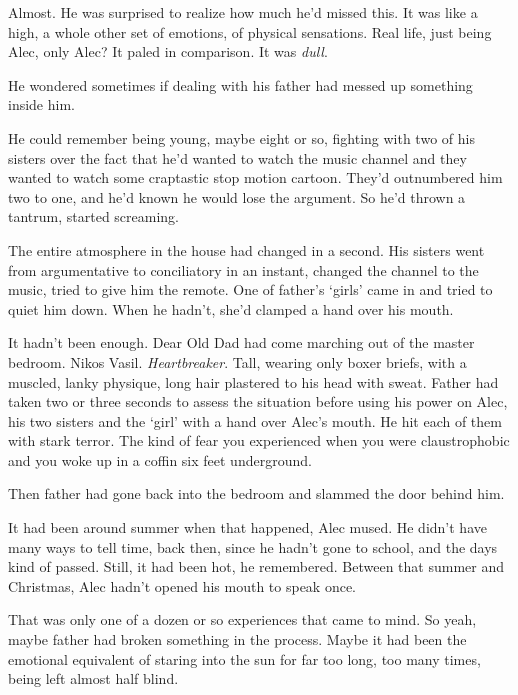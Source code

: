 Almost.  He was surprised to realize how much he'd missed this.  It was like a high, a whole other set of emotions, of physical sensations.  Real life, just being Alec, only Alec?  It paled in comparison.  It was \emph{dull}.



He wondered sometimes if dealing with his father had messed up something inside him.



He could remember being young, maybe eight or so, fighting with two of his sisters over the fact that he'd wanted to watch the music channel and they wanted to watch some craptastic stop motion cartoon.  They'd outnumbered him two to one, and he'd known he would lose the argument.  So he'd thrown a tantrum, started screaming.



The entire atmosphere in the house had changed in a second.  His sisters went from argumentative to conciliatory in an instant, changed the channel to the music, tried to give him the remote.  One of father's `girls' came in and tried to quiet him down.  When he hadn't, she'd clamped a hand over his mouth.



It hadn't been enough.  Dear Old Dad had come marching out of the master bedroom.  Nikos Vasil.  \emph{Heartbreaker}.  Tall, wearing only boxer briefs, with a muscled, lanky physique, long hair plastered to his head with sweat.  Father had taken two or three seconds to assess the situation before using his power on Alec, his two sisters and the `girl' with a hand over Alec's mouth.  He hit each of them with stark terror.  The kind of fear you experienced when you were claustrophobic and you woke up in a coffin six feet underground.



Then father had gone back into the bedroom and slammed the door behind him.



It had been around summer when that happened, Alec mused.  He didn't have many ways to tell time, back then, since he hadn't gone to school, and the days kind of passed.  Still, it had been hot, he remembered.  Between that summer and Christmas, Alec hadn't opened his mouth to speak once.



That was only one of a dozen or so experiences that came to mind.  So yeah, maybe father had broken something in the process.  Maybe it had been the emotional equivalent of staring into the sun for far too long, too many times, being left almost half blind.



